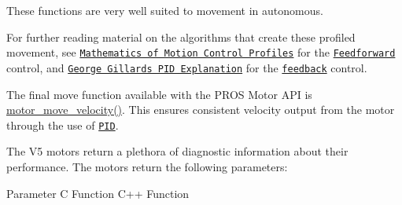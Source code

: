 These functions are very well suited to movement in autonomous.

For further reading material on the algorithms that create these profiled movement, see \href{https://pdfs.semanticscholar.org/a229/fdba63d8d68abd09f70604d56cc07ee50f7d.pdf}{\tt Mathematics of Motion Control Profiles} for the \href{https://en.wikipedia.org/wiki/Feed_forward_(control)}{\tt Feedforward} control, and \href{http://georgegillard.com/documents/2-introduction-to-pid-controllers}{\tt George Gillard\textquotesingle{}s P\+ID Explanation} for the \href{https://en.wikipedia.org/wiki/Control_theory#PID_feedback_control}{\tt feedback} control.

The final {\ttfamily move} function available with the P\+R\+OS Motor A\+PI is {\ttfamily \hyperlink{motors_8h_a5a366399c1ff416002641fd05e6d7808}{motor\+\_\+move\+\_\+velocity()}}. This ensures consistent velocity output from the motor through the use of \href{http://georgegillard.com/documents/2-introduction-to-pid-controllers}{\tt P\+ID}.

The V5 motors return a plethora of diagnostic information about their performance. The motors return the following parameters\+:

Parameter C Function C++ Function 

